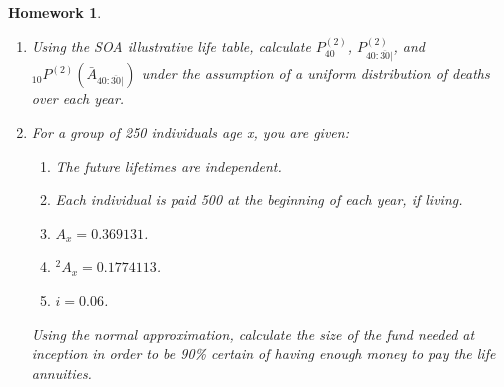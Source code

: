 \documentclass[11pt,fleqn,oneside]{book}
\newtheorem{homework}{Homework}
\begin{document}
\begin{homework}
\label{HW21}
\begin{enumerate}
\item Using the SOA illustrative life table, calculate $P_{40}^{(2)}$, $P_{40:\overline{30}|}^{(2)}$, and $_{10}P^{(2)}\left(\bar{A}_{40:\overline{30}|}\right)$ under the assumption of a uniform distribution of deaths over each year.
\item For a group of 250 individuals age x, you are given:
\begin{enumerate}
\item The future lifetimes are independent.
\item Each individual is paid 500 at the beginning of each year, if living.
\item $A_x = 0.369131$.
\item $^2A_x = 0.1774113$.
\item $i=0.06$.
\end{enumerate}
Using the normal approximation, calculate the size of the fund needed at inception in order to be 90\% certain of having enough money to pay the life annuities.
\end{enumerate}
\end{homework}
\end{document}

